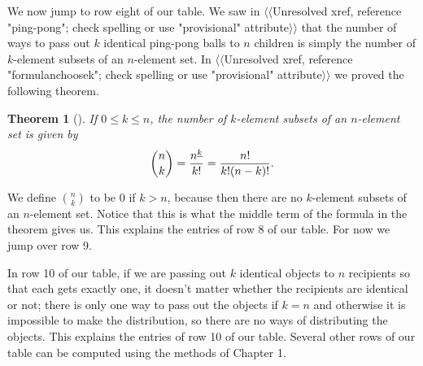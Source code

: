 \documentclass[10pt,]{book}
\theoremstyle{plain}
\newtheorem{theorem}{Theorem}[section]
\theoremstyle{definition}
\numberwithin{equation}{chapter}
\begin{document}
\par
We now jump to row eight of our table. We saw in {$\langle\langle$Unresolved xref, reference "ping-pong"; check spelling or use "provisional" attribute$\rangle\rangle$} that the number of ways to pass out \(k\) identical ping-pong balls to \(n\) children is simply the number of \(k\)-element subsets of an \(n\)-element set. In {$\langle\langle$Unresolved xref, reference "formulanchoosek"; check spelling or use "provisional" attribute$\rangle\rangle$} we proved the following theorem.%
\begin{theorem}[{}]\label{theorem-3}
If \(0\le k \le n\), the number of \(k\)-element subsets of an \(n\)-element set is given by%
\begin{equation*}
{n\choose k} = {n^{\underline{k}}\over k!}
= {n!\over k!(n-k)!}.
\end{equation*}
%
\end{theorem}
We define \(n \choose k\) to be 0 if \(k>n\), because then there are no \(k\)-element subsets of an \(n\)-element set. Notice that this is what the middle term of the formula in the theorem gives us. This explains the entries of row 8 of our table. For now we jump over row 9.%
\par
In row 10 of our table, if we are passing out \(k\) identical objects to \(n\) recipients so that each gets exactly one, it doesn't matter whether the recipients are identical or not; there is only one way to pass out the objects if \(k=n\) and otherwise it is impossible to make the distribution, so there are no ways of distributing the objects. This explains the entries of row 10 of our table. Several other rows of our table can be computed using the methods of Chapter 1.%
\typeout{************************************************}
\typeout{************************************************}
\end{document}
